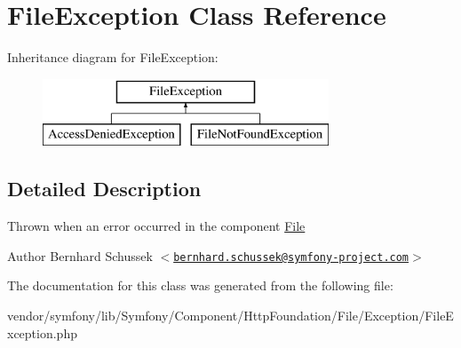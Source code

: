 \hypertarget{class_symfony_1_1_component_1_1_http_foundation_1_1_file_1_1_exception_1_1_file_exception}{
\section{\-File\-Exception \-Class \-Reference}
\label{class_symfony_1_1_component_1_1_http_foundation_1_1_file_1_1_exception_1_1_file_exception}
}
\-Inheritance diagram for \-File\-Exception\-:\begin{figure}[H]
\begin{center}
\leavevmode
\includegraphics[height=2.000000cm]{class_symfony_1_1_component_1_1_http_foundation_1_1_file_1_1_exception_1_1_file_exception}
\end{center}
\end{figure}


\subsection{\-Detailed \-Description}
\-Thrown when an error occurred in the component \hyperlink{class_symfony_1_1_component_1_1_http_foundation_1_1_file_1_1_file}{\-File}

\begin{DoxyAuthor}{\-Author}
\-Bernhard \-Schussek $<$\href{mailto:bernhard.schussek@symfony-project.com}{\tt bernhard.\-schussek@symfony-\/project.\-com}$>$ 
\end{DoxyAuthor}


\-The documentation for this class was generated from the following file\-:\begin{DoxyCompactItemize}
\item 
vendor/symfony/lib/\-Symfony/\-Component/\-Http\-Foundation/\-File/\-Exception/\-File\-Exception.\-php\end{DoxyCompactItemize}
